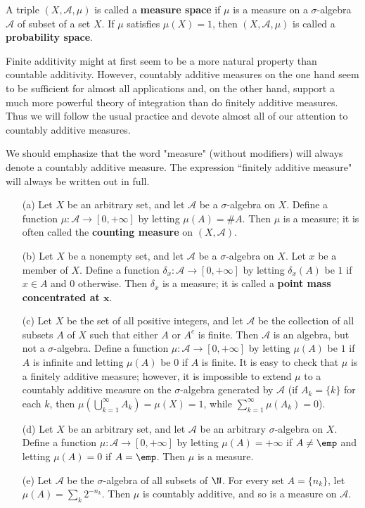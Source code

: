 \begin{definition}
A triple $(X,\mathcal{A},\mu)$ is called a \textbf{measure space} if $\mu$ is a measure on a $\sigma$-algebra $\mathcal{A}$ of subset of a set $X$. If $\mu$ satisfies $\mu(X)=1$, then $(X,\mathcal{A},\mu)$ is called a \textbf{probability space}.
\end{definition}
Finite additivity might at first seem to be a more natural property than countable additivity. However, countably additive measures on the one hand seem to be sufficient for almost all applications and, on the other hand, support a much more powerful theory of integration than do finitely additive measures. Thus we will follow the usual practice and devote almost all of our attention to countably additive measures.\par
We should emphasize that the word "measure" (without modifiers) will always denote a countably additive measure. The expression “finitely additive measure" will always be written out in full.  
\begin{example}\label{measure space eg}
\mbox{}
\begin{itemize}
\item[(a)] Let $X$ be an arbitrary set, and let $\mathcal{A}$ be a $\sigma$-algebra on $X$. Define a function $\mu:\mathcal{A}\to[0,+\infty]$ by letting $\mu(A)=\# A$. Then $\mu$ is a measure; it is often called the \textbf{counting measure} on $(X,\mathcal{A})$.
\item[(b)] Let $X$ be a nonempty set, and let $\mathcal{A}$ be a $\sigma$-algebra on $X$. Let $x$ be a member of $X$. Define a function $\delta_x:\mathcal{A}\to[0,+\infty]$ by letting $\delta_x(A)$ be $1$ if $x\in A$ and $0$ otherwise. Then $\delta_x$ is a measure; it is called a \textbf{point mass concentrated at $\bm{x}$}.
\item[(c)] Let $X$ be the set of all positive integers, and let $\mathcal{A}$ be the collection of all subsets $A$ of $X$ such that either $A$ or $A^c$ is finite. Then $\mathcal{A}$ is an algebra, but not a $\sigma$-algebra. Define a function $\mu:\mathcal{A}\to[0,+\infty]$ by letting $\mu(A)$ be $1$ if $A$ is infinite and letting $\mu(A)$ be $0$ if $A$ is finite. It is easy to check that $\mu$ is a finitely additive measure; however, it is impossible to extend $\mu$ to a countably additive measure on the $\sigma$-algebra generated by $\mathcal{A}$ (if $A_k=\{k\}$ for each $k$, then $\mu(\bigcup_{k=1}^{\infty}A_k)=\mu(X)=1$, while $\sum_{k=1}^{\infty}\mu(A_k)=0$).
\item[(d)] Let $X$ be an arbitrary set, and let $\mathcal{A}$ be an arbitrary $\sigma$-algebra on $X$. Define a function $\mu:\mathcal{A}\to[0,+\infty]$ by letting $\mu(A)=+\infty$ if $A\neq\emp$ and letting $\mu(A)=0$ if $A=\emp$. Then $\mu$ is a measure.
\item[(e)] Let $\mathcal{A}$ be the $\sigma$-algebra of all subsets of $\N$. For every set $A=\{n_k\}$, let $\mu(A)=\sum_k2^{-n_k}$. Then $\mu$ is countably additive, and so is a measure on $\mathcal{A}$. 
\end{itemize}
\end{example}

